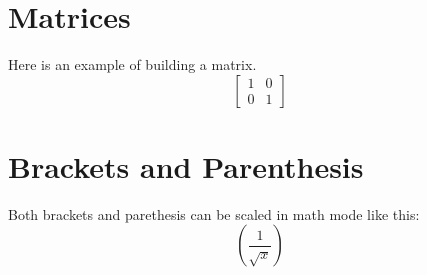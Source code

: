 \documentclass{article}
\begin{document}
  \section{Matrices}

  Here is an example of building a matrix.
  \begin{equation}
    \left[
  \begin{matrix}
    1 & 0\\
    0 & 1
  \end{matrix}
    \right]
\end{equation}
\section{Brackets and Parenthesis}
Both brackets and parethesis can be scaled in math mode like this:
\begin{equation}
  \left(\frac{1}{\sqrt{x}}\right)
\end{equation}
\end{document}
